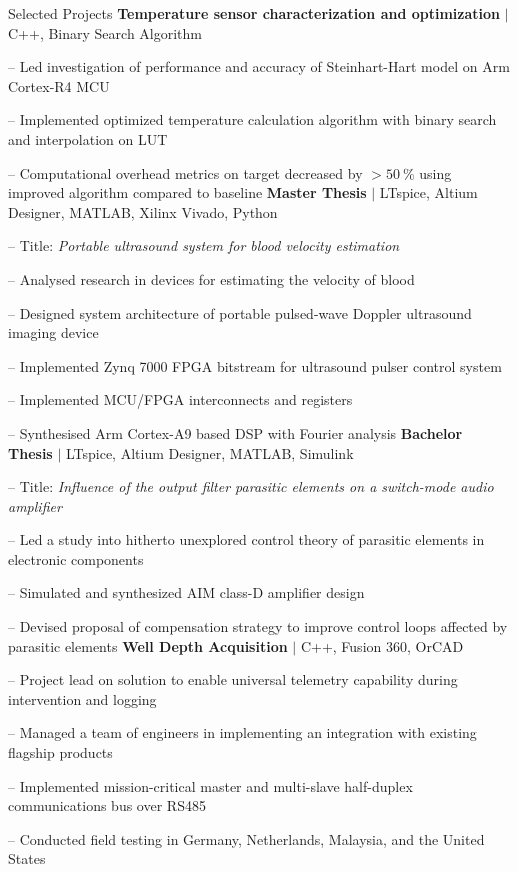 
\begin{rubric}{\faTasks[solid]  Selected Projects}
\entry*[2024][] \textbf{Temperature sensor characterization and optimization} $|$ C++, Binary Search Algorithm \par
	-- Led investigation of performance and accuracy of Steinhart-Hart model on Arm Cortex\textsuperscript{\textcopyright}-R4 MCU \par
	-- Implemented optimized temperature calculation algorithm with binary search and interpolation on LUT \par
	-- Computational overhead metrics on target decreased by $>\qty{50}{\percent}$ using improved algorithm compared to baseline
\entry*[2023][]%
	\textbf{Master Thesis} $|$ LTspice, Altium Designer, MATLAB, Xilinx Vivado, Python \par
	-- Title: \emph{Portable ultrasound system for blood velocity estimation} \par
	-- Analysed research in devices for estimating the velocity of blood \par
	-- Designed system architecture of portable pulsed-wave Doppler ultrasound imaging device \par
	-- Implemented Zynq 7000 FPGA bitstream for ultrasound pulser control system \par
	-- Implemented MCU/FPGA interconnects and registers \par
	-- Synthesised Arm Cortex\textsuperscript{\textcopyright}-A9 based DSP with Fourier analysis
%
\entry*[2020][] \textbf{Bachelor Thesis} $|$ LTspice, Altium Designer, MATLAB, Simulink \par
	-- Title: \emph{Influence of the output filter parasitic elements on a switch-mode audio amplifier} \par
	-- Led a study into hitherto unexplored control theory of parasitic elements in electronic components \par
	-- Simulated and synthesized AIM class-D amplifier design \par
	-- Devised proposal of compensation strategy to improve control loops affected by parasitic elements
%
\entry*[2017][] \textbf{Well Depth Acquisition} $|$ C++, Fusion 360, OrCAD \par
	-- Project lead on solution to enable universal telemetry capability during intervention and logging \par
	-- Managed a team of engineers in implementing an integration with existing flagship products \par
	-- Implemented mission-critical master and multi-slave half-duplex communications bus over RS485 \par
	-- Conducted field testing in Germany, Netherlands, Malaysia, and the United States
%
\end{rubric}